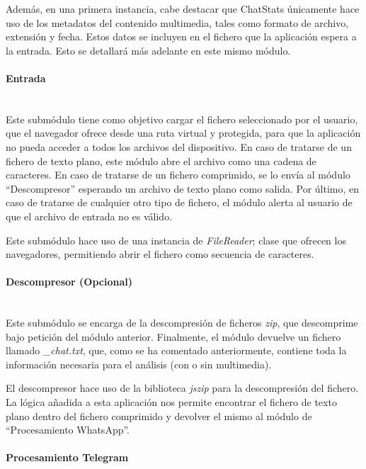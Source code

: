 Además, en una primera instancia, cabe destacar que ChatStats únicamente hace uso de los metadatos del contenido multimedia, tales como formato de archivo, extensión y fecha. Estos datos se incluyen en el fichero que la aplicación espera a la entrada. Esto se detallará más adelante en este mismo módulo.


\paragraph{Entrada}\mbox{}\\

Este submódulo tiene como objetivo cargar el fichero seleccionado por el usuario, que el navegador ofrece desde una ruta virtual y protegida, para que la aplicación no pueda acceder a todos los archivos del dispositivo. En caso de tratarse de un fichero de texto plano, este módulo abre el archivo como una cadena de caracteres. En caso de tratarse de un fichero comprimido, se lo envía al módulo ``Descompresor'' esperando un archivo de texto plano como salida. Por último, en caso de tratarse de cualquier otro tipo de fichero, el módulo alerta al usuario de que el archivo de entrada no es válido.

Este submódulo hace uso de una instancia de \textit{FileReader}; clase que ofrecen los navegadores, permitiendo abrir el fichero como secuencia de caracteres.

\paragraph{Descompresor (Opcional)}\mbox{}\\

Este submódulo se encarga de la descompresión de ficheros \textit{zip}, que descomprime bajo petición del módulo anterior. Finalmente, el módulo devuelve un fichero llamado \textit{\_chat.txt}, que, como se ha comentado anteriormente, contiene toda la información necesaria para el análisis (con o sin multimedia).

El descompresor hace uso de la biblioteca \textit{jszip} para la descompresión del fichero. La lógica añadida a esta aplicación nos permite encontrar el fichero de texto plano dentro del fichero comprimido y devolver el mismo al módulo de ``Procesamiento WhatsApp''.


\paragraph{Procesamiento Telegram}\mbox{}\\

